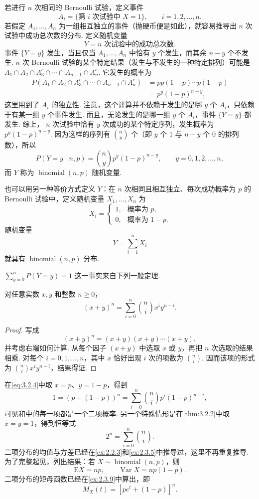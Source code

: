 若进行 $n$ 次相同的 Bernoulli 试验，定义事件
$$A_i=\{\text{第 $i$ 次试验中 $X=1$}\},\qquad i=1,2,\ldots,n.$$
若假定 $A_1,\ldots,A_n$ 为一组相互独立的事件（抛硬币便是如此），就容易推导出 $n$ 次试验中成功总次数的分布. 定义随机变量
$$Y=\text{$n$ 次试验中的成功总次数}.$$
事件 $\{Y=y\}$ 发生，当且仅当 $A_1,\ldots,A_n$ 中恰有 $y$ 个发生，而其余 $n-y$ 个不发生. $n$ 次 Bernoulli 试验的某个特定结果（发生与不发生的一种特定排列）可能是 $A_1\cap A_2\cap A_3^c\cap\cdots\cap A_{n-1}\cap A_n^c$. 它发生的概率为
$$\begin{aligned}
P(A_1\cap A_2\cap A_3^c\cap\cdots\cap A_{n-1}\cap A_n^c)
&=pp(1-p)\cdots p(1-p)\\
&=p^y(1-p)^{n-y},
\end{aligned}$$
这里用到了 $A_i$ 的独立性. 注意，这个计算并不依赖于发生的是哪 $y$ 个 $A_i$，只依赖于有某一组 $y$ 个事件发生. 而且，无论发生的是哪一组 $y$ 个 $A_i$，事件 $\{Y=y\}$ 都发生. 综上，
$n$ 次试验中恰有 $y$ 次成功的某个特定序列，发生概率为 $p^y(1-p)^{n-y}$. 因为这样的序列有 $\binom ny$ 个（即 $y$ 个 $1$ 与 $n-y$ 个 $0$ 的排列数），所以
$$P(Y=y\mid n,p)=\binom ny p^y(1-p)^{n-y},\qquad y=0,1,2,\ldots,n,$$
而 $Y$ 称为 $\operatorname{binomial}(n,p)$ 随机变量.

也可以用另一种等价方式定义 $Y$：在 $n$ 次相同且相互独立、每次成功概率为 $p$ 的 Bernoulli 试验中，定义随机变量 $X_1,\ldots,X_n$ 为
$$X_i=\begin{cases}1,&\text{概率为 }p,\\0,&\text{概率为 }1-p.\end{cases}$$
随机变量
$$Y=\sum_{i=1}^nX_i$$
就具有 $\operatorname{binomial}(n,p)$ 分布.

$\sum_{y=0}^nP(Y=y)=1$ 这一事实来自下列一般定理.
\begin{theorem}[二项式定理]\label{thm:3.2.2}
对任意实数 $x,y$ 和整数 $n\ge0$，
\begin{equation}\label{eq:3.2.4}
(x+y)^n=\sum_{i=0}^n\binom ni x^iy^{n-i}.
\end{equation}
\end{theorem}
\begin{proof}
写成
$$(x+y)^n=(x+y)(x+y)\cdots(x+y),$$
并考虑右端如何计算. 从每个因子 $(x+y)$ 中选取 $x$ 或 $y$，再把 $n$ 次选取的结果相乘. 对每个 $i=0,1,\ldots,n$，其中 $x$ 恰好出现 $i$ 次的项数为 $\binom ni$. 因而该项的形式为 $\binom ni x^iy^{n-i}$，结果得证.
\end{proof}
在\eqref{eq:3.2.4}中取 $x=p$、$y=1-p$，得到
$$1=(p+(1-p))^n=\sum_{i=0}^n\binom ni p^i(1-p)^{n-i},$$
可见和中的每一项都是一个二项概率. 另一个特殊情形是在\autoref{thm:3.2.2}中取 $x=y=1$，得到恒等式
$$2^n=\sum_{i=0}^n\binom ni.$$
二项分布的均值与方差已经在\autoref{ex:2.2.3}和\autoref{ex:2.3.5}中推导过，这里不再重复推导. 为了完整起见，列出结果：若 $X\sim\operatorname{binomial}(n,p)$，则
$$\mathrm EX=np,\qquad\operatorname{Var}X=np(1-p).$$
二项分布的矩母函数已经在\autoref{ex:2.3.9}中算出，即
$$M_X(t)=[pe^t+(1-p)]^n.$$

